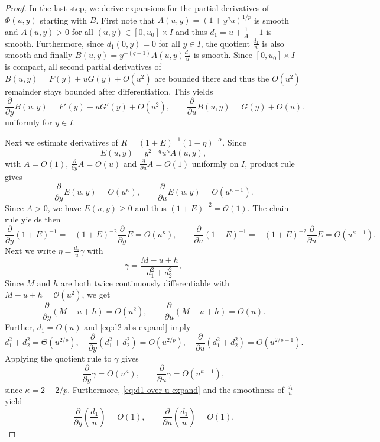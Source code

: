 \documentclass{article}
\begin{document}
\begin{proof}
    In the last step, we derive expansions for the partial derivatives of $\Phi(u,y)$ starting with $B$.
    First note that $A(u,y)=(1+y^q u)^{1/p}$ is smooth and $A(u,y) > 0$ for all $(u,y) \in [0,u_0]\times I$
    and thus $d_1 = u + \frac 1A - 1$ is smooth.
    Furthermore, since $d_1(0,y) = 0$ for all $y \in I$, the quotient $\frac{d_1}{u}$ is also smooth and finally $B(u,y)=y^{-(q-1)}A(u,y)\frac{d_1}{u}$ is smooth.
    Since $[0,u_0]\times I$ is compact, all second partial derivatives of $B(u,y)=F(y)+uG(y)+O(u^2)$ are bounded there
     and thus the $O(u^2)$ remainder stays bounded after differentiation.
    This yields
    \[
        \frac{\partial}{\partial y} B(u,y)=F'(y)+uG'(y)+O(u^2),\qquad
        \frac{\partial}{\partial u} B(u,y)=G(y)+O(u).
    \]
    uniformly for $y \in I$.

    Next we estimate derivatives of $R=(1+E)^{-1}(1-\eta)^{-\alpha}$.
    Since
    \[
        E(u,y)=y^{2-q}u^\kappa A(u,y),
    \]
    with $A=O(1)$, $\frac{\partial}{\partial y} A=O(u)$ and $\frac{\partial}{\partial u} A=O(1)$ uniformly on $I$, product
    rule gives
    \[
      \frac{\partial}{\partial y} E(u,y)=O(u^\kappa),\qquad
      \frac{\partial}{\partial u} E(u,y)=O(u^{\kappa-1}).
    \]
    Since $A >0$, we have $E(u,y) \geq 0$ and thus $(1+E)^{-2} = \mathcal{O}(1)$.
    The chain rule yields then
    \[
        \frac{\partial}{\partial y} (1+E)^{-1}=-(1+E)^{-2}\frac{\partial}{\partial y} E=O(u^\kappa),\qquad
        \frac{\partial}{\partial u} (1+E)^{-1}=-(1+E)^{-2}\frac{\partial}{\partial u} E=O(u^{\kappa-1}).
    \]
    Next we write $\eta=\frac{d_1}{u}\gamma$ with
    \[
        \gamma=\frac{M-u+h}{d_1^2+d_2^2},
    \]
    Since $M$ and $h$ are both twice continuously differentiable with $M - u + h  = \mathcal{O}(u^2)$, we get
    \[
        \frac{\partial}{\partial y} (M-u+h)=O(u^2),\qquad
        \frac{\partial}{\partial u} (M-u+h)=O(u).
    \]
    Further, $d_1=O(u)$ and \eqref{eq:d2-abs-expand} imply
    \[
        d_1^2+d_2^2=\Theta(u^{2/p}),\quad
        \frac{\partial}{\partial y}(d_1^2+d_2^2)=O(u^{2/p}),\quad
        \frac{\partial}{\partial u}(d_1^2+d_2^2)=O(u^{2/p-1}).
    \]
    Applying the quotient rule to $\gamma$ gives
    \[
        \frac{\partial}{\partial y} \gamma=O(u^\kappa),\qquad
        \frac{\partial}{\partial u} \gamma=O(u^{\kappa-1}),
    \]
    since $\kappa=2-2/p$.
    Furthermore, \eqref{eq:d1-over-u-expand} and the smoothness of $\frac{d_1}{u}$ yield
    \[
        \frac{\partial}{\partial y} \left(\frac{d_1}{u}\right)=O(1),\qquad
        \frac{\partial}{\partial u} \left(\frac{d_1}{u}\right)=O(1).
\]
\end{proof}
\end{document}
